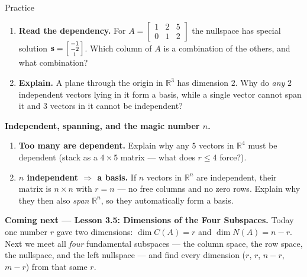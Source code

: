\documentclass[10pt]{article}
\newcommand{\svec}{\mathbf{s}}
\begin{document}
\begin{notesbox}{Practice}
\begin{enumerate}[leftmargin=1.9em, itemsep=11pt]
\begin{enumerate}[label=(\alph*), leftmargin=1.8em, itemsep=6pt]
      \item $A=\begin{bmatrix} 1 & 2 \\ 3 & 6 \end{bmatrix}$ \vspace{1.1cm}
    \end{enumerate}
  \item \textbf{Read the dependency.} For $A=\begin{bmatrix} 1 & 2 & 5 \\ 0 & 1 & 2 \end{bmatrix}$ the
        nullspace has special solution $\svec=\begin{bsmallmatrix} -1\\-2\\1 \end{bsmallmatrix}$. Which
        column of $A$ is a combination of the others, and what combination? 
  \item \textbf{Explain.} A plane through the origin in $\mathbb{R}^3$ has dimension $2$. Why do
        \emph{any} $2$ independent vectors lying in it form a basis, while a single vector cannot span it
        and $3$ vectors in it cannot be independent? 
\end{enumerate}
\end{notesbox}

\begin{extensionbox}
\textbf{Independent, spanning, and the magic number $n$.}
\begin{enumerate}[label=(\alph*), leftmargin=1.8em, itemsep=5pt]
  \item \textbf{Too many are dependent.} Explain why any $5$ vectors in $\mathbb{R}^4$ must be dependent
        (stack as a $4\times5$ matrix --- what does $r\le4$ force?).
  \item \textbf{$n$ independent $\Rightarrow$ a basis.} If $n$ vectors in $\mathbb{R}^n$ are independent,
        their matrix is $n\times n$ with $r=n$ --- no free columns and no zero rows. Explain why they then
        also \emph{span} $\mathbb{R}^n$, so they automatically form a basis.
\end{enumerate}
\end{extensionbox}

\begin{spiralbox}
\textbf{Coming next --- Lesson 3.5: Dimensions of the Four Subspaces.} Today one number $r$ gave two
dimensions: $\dim C(A)=r$ and $\dim N(A)=n-r$. Next we meet all \emph{four} fundamental subspaces --- the
column space, the row space, the nullspace, and the left nullspace --- and find every dimension
($r$, $r$, $n-r$, $m-r$) from that same $r$.
\end{spiralbox}
\end{document}
